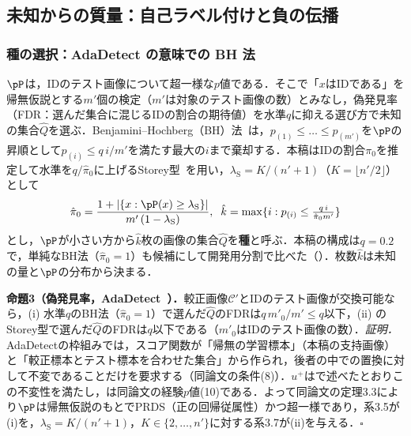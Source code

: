 \subsection{未知からの質量：自己ラベル付けと負の伝播}
\label{sec:seed}
\subsubsection{種の選択：AdaDetect の意味での BH 法}
$\pP$は，IDのテスト画像について超一様な$p$値である．そこで「$x$はIDである」を帰無仮説とする$m'$個の検定（$m'$は対象のテスト画像の数）とみなし，偽発見率（FDR：選んだ集合に混じるIDの割合の期待値）を水準$q$に抑える選び方で未知の集合$\hat{Q}$を選ぶ．Benjamini--Hochberg（BH）法~\cite{benjamini1995bh}は，$p_{(1)}\le\dots\le p_{(m')}$を$\pP$の昇順として$p_{(i)}\le q\,i/m'$を満たす最大の$i$まで棄却する．本稿はIDの割合$\pi_0$を推定して水準を$q/\hat{\pi}_0$に上げるStorey型~\cite{storey2002}を用い，$\lambda_{\mathrm{S}}=K/(n'+1)$（$K=\lfloor n'/2\rfloor$）として
\begin{equation}
\hat{\pi}_0=\frac{1+|\{x:\pP(x)\ge\lambda_{\mathrm{S}}\}|}{m'\,(1-\lambda_{\mathrm{S}})},\;\;
\hat{k}=\max\{i:p_{(i)}\le\tfrac{q\,i}{\hat{\pi}_0 m'}\}
\label{eq:bh}
\end{equation}
とし，$\pP$が小さい方から$\hat{k}$枚の画像の集合$\hat{Q}$を\textbf{種}と呼ぶ．本稿の構成は$q{=}0.2$で，単純なBH法（$\hat{\pi}_0{=}1$）も候補にして開発用分割で比べた（）．枚数$\hat{k}$は未知の量と$\pP$の分布から決まる．

\textbf{命題3（偽発見率，AdaDetect~\cite{marandon2024adadetect}）．}較正画像$\mathcal{C}'$とIDのテスト画像が交換可能なら，(i) 水準$q$のBH法（$\hat{\pi}_0=1$）で選んだ$\hat{Q}$のFDRは$q\,m'_0/m'\le q$以下，(ii) のStorey型で選んだ$\hat{Q}$のFDRは$q$以下である（$m'_0$はIDのテスト画像の数）．\textit{証明．}AdaDetectの枠組みでは，スコア関数が「帰無の学習標本」（本稿の支持画像）と「較正標本とテスト標本を合わせた集合」から作られ，後者の中での置換に対して不変であることだけを要求する（同論文の条件(8)）．$u^{+}$はで述べたとおりこの不変性を満たし，は同論文の経験$p$値(10)である．よって同論文の定理3.3により$\pP$は帰無仮説のもとでPRDS（正の回帰従属性）かつ超一様であり，系3.5が(i)を，$\lambda_{\mathrm{S}}=K/(n'+1)$，$K\in\{2,\dots,n'\}$に対する系3.7が(ii)を与える．$\square$


